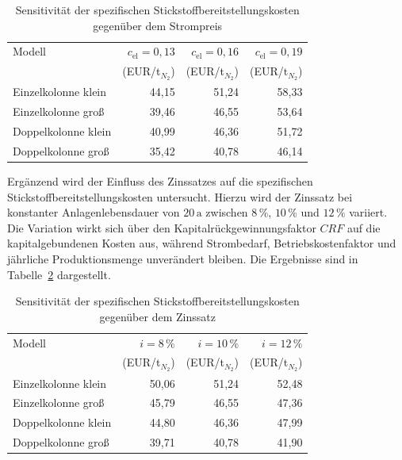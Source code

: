 \begin{table}[H]
\centering
\caption{Sensitivität der spezifischen Stickstoffbereitstellungskosten gegenüber dem Strompreis}
\label{tab:sensitivitaet_stickstoffkosten}
\small
\begin{tabular}{lrrr}
\hline
Modell 
& $c_\mathrm{el}=0{,}13$ 
& $c_\mathrm{el}=0{,}16$ 
& $c_\mathrm{el}=0{,}19$ \\
 & (EUR/t$_{N_2}$) & (EUR/t$_{N_2}$) & (EUR/t$_{N_2}$) \\
\hline
Einzelkolonne klein 
& 44{,}15
& 51{,}24
& 58{,}33 \\

Einzelkolonne groß  
& 39{,}46
& 46{,}55
& 53{,}64 \\

Doppelkolonne klein 
& 40{,}99
& 46{,}36
& 51{,}72 \\

Doppelkolonne groß  
& 35{,}42
& 40{,}78
& 46{,}14 \\
\hline
\end{tabular}
\end{table}

Ergänzend wird der Einfluss des Zinssatzes auf die spezifischen
Stickstoffbereitstellungskosten untersucht. Hierzu wird der Zinssatz bei
konstanter Anlagenlebensdauer von \(20\,\mathrm{a}\) zwischen \(8\,\%\),
\(10\,\%\) und \(12\,\%\) variiert. Die Variation wirkt sich über den
Kapitalrückgewinnungsfaktor \(CRF\) auf die kapitalgebundenen Kosten aus,
während Strombedarf, Betriebskostenfaktor und jährliche Produktionsmenge
unverändert bleiben. Die Ergebnisse sind in
Tabelle~\ref{tab:sensitivitaet_stickstoffkosten_zins} dargestellt.

\begin{table}[H]
\centering
\caption{Sensitivität der spezifischen Stickstoffbereitstellungskosten gegenüber dem Zinssatz}
\label{tab:sensitivitaet_stickstoffkosten_zins}
\small
\begin{tabular}{lrrr}
\hline
Modell 
& $i=8\,\%$ 
& $i=10\,\%$ 
& $i=12\,\%$ \\
 & (EUR/t$_{N_2}$) & (EUR/t$_{N_2}$) & (EUR/t$_{N_2}$) \\
\hline
Einzelkolonne klein 
& 50{,}06
& 51{,}24
& 52{,}48 \\

Einzelkolonne groß  
& 45{,}79
& 46{,}55
& 47{,}36 \\

Doppelkolonne klein 
& 44{,}80
& 46{,}36
& 47{,}99 \\

Doppelkolonne groß  
& 39{,}71
& 40{,}78
& 41{,}90 \\
\hline
\end{tabular}
\end{table}

